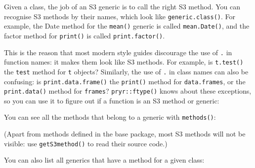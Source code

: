 Given a class, the job of an S3 generic is to call the right S3 method.
You can recognise S3 methods by their names, which look like
\texttt{generic.class()}. For example, the Date method for the
\texttt{mean()} generic is called \texttt{mean.Date()}, and the factor
method for \texttt{print()} is called \texttt{print.factor()}.
 

This is the reason that most modern style guides discourage the use of
\texttt{.} in function names: it makes them look like S3 methods. For
example, is \texttt{t.test()} the \texttt{test} method for \texttt{t}
objects? Similarly, the use of \texttt{.} in class names can also be
confusing: is \texttt{print.data.frame()} the \texttt{print()} method
for \texttt{data.frames}, or the \texttt{print.data()} method for
\texttt{frames}? \texttt{pryr::ftype()} knows about these exceptions, so
you can use it to figure out if a function is an S3 method or generic:

\begin{Shaded}
\begin{Highlighting}[]
\end{Highlighting}
\end{Shaded}

You can see all the methods that belong to a generic with
\texttt{methods()}:

\begin{Shaded}
\begin{Highlighting}[]
\NormalTok{(}\NormalTok{)}
\NormalTok{(}\NormalTok{)}
\CommentTok{#> }
\end{Highlighting}
\end{Shaded}

(Apart from methods defined in the base package, most S3 methods will
not be visible: use \texttt{getS3method()} to read their source code.)

You can also list all generics that have a method for a given class:

